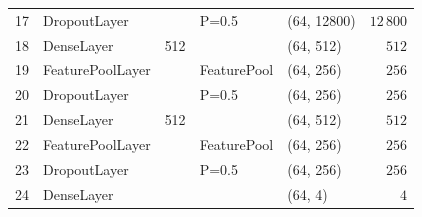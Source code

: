 \begin{frame}
\begin{table}[]
\begin{tabular}{@{}clcllr@{}}
17 & DropoutLayer              &      & P=0.5       & (64, 12800)         & $12\,800$   \\
18 & DenseLayer                & 512  &             & (64, 512)           & $512$     \\
19 & FeaturePoolLayer          &      & FeaturePool & (64, 256)           & $256$     \\
20 & DropoutLayer              &      & P=0.5       & (64, 256)           & $256$     \\
21 & DenseLayer                & 512  &             & (64, 512)           & $512$     \\
22 & FeaturePoolLayer          &      & FeaturePool & (64, 256)           & $256$     \\
23 & DropoutLayer              &      & P=0.5       & (64, 256)           & $256$     \\
24 & DenseLayer                &      &             & (64, 4)             & $4$       \\ \bottomrule
\end{tabular}
\end{table}

\end{frame}


